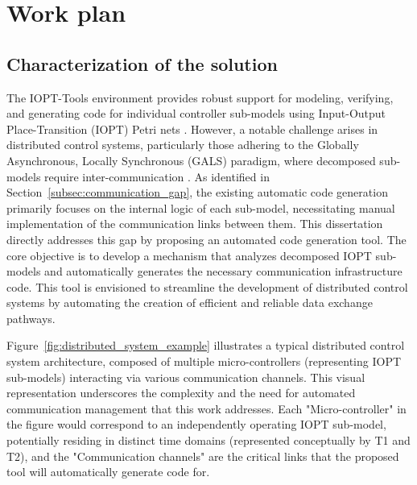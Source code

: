 
%

\chapter{Work plan}
\label{cha:work_plan}


\section{Characterization of the solution}
\label{sec:characterization_of_the_solution}

 The IOPT-Tools environment provides robust support for modeling, verifying, and generating code for individual controller sub-models using Input-Output Place-Transition (IOPT) Petri nets \cite{iopttools, barros2004, RefiningIOPT}. However, a notable challenge arises in distributed control systems, particularly those adhering to the Globally Asynchronous, Locally Synchronous (GALS) paradigm, where decomposed sub-models require inter-communication \cite{galsactd, Barrosadd}. As identified in Section~\ref{subsec:communication_gap}, the existing automatic code generation primarily focuses on the internal logic of each sub-model, necessitating manual implementation of the communication links between them. This dissertation directly addresses this gap by proposing an automated code generation tool. The core objective is to develop a mechanism that analyzes decomposed IOPT sub-models and automatically generates the necessary communication infrastructure code. This tool is envisioned to streamline the development of distributed control systems by automating the creation of efficient and reliable data exchange pathways. 
 
Figure~\ref{fig:distributed_system_example} illustrates a typical distributed control system architecture, composed of multiple micro-controllers (representing IOPT sub-models) interacting via various communication channels. This visual representation underscores the complexity and the need for automated communication management that this work addresses. Each "Micro-controller" in the figure would correspond to an independently operating IOPT sub-model, potentially residing in distinct time domains (represented conceptually by T1 and T2), and the "Communication channels" are the critical links that the proposed tool will automatically generate code for.

